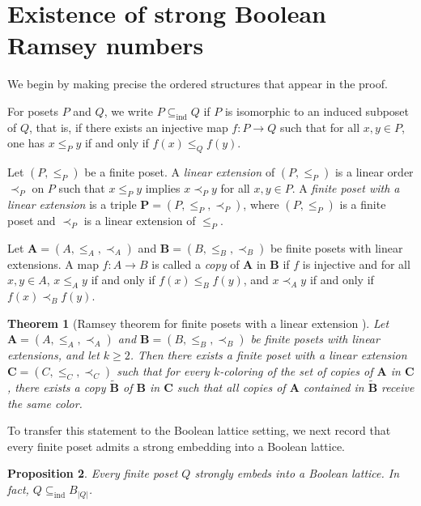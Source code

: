 \documentclass[twoside,12pt]{article}
\newtheorem{theorem}{Theorem}[section]
\newtheorem{proposition}[theorem]{Proposition}
\newcommand{\ind}{\mathrm{ind}}
\begin{document}
\section{Existence of strong Boolean Ramsey numbers}\label{sec6}











We begin by making precise the ordered structures that appear in the proof.

For posets $P$ and $Q$, we write $P\subseteq_{\ind} Q$ if $P$ is isomorphic to an
induced subposet of $Q$, that is, if there exists an injective map
$f:P\to Q$ such that for all $x,y\in P$, one has
$x\le_P y$ if and only if $f(x)\le_Q f(y)$.

Let $(P,\le_P)$ be a finite poset. A \emph{linear extension} of $(P,\le_P)$ is a
linear order $\prec_P$ on $P$ such that $x\le_P y$ implies $x\prec_P y$ for all
$x,y\in P$. A \emph{finite poset with a linear extension} is a triple
$\mathbf P=(P,\le_P,\prec_P)$, where $(P,\le_P)$ is a finite poset and
$\prec_P$ is a linear extension of $\le_P$.

Let $\mathbf A=(A,\le_A,\prec_A)$ and $\mathbf B=(B,\le_B,\prec_B)$ be finite
posets with linear extensions. A map $f:A\to B$ is called a \emph{copy} of
$\mathbf A$ in $\mathbf B$ if $f$ is injective and for all $x,y\in A$,
$x\le_A y$ if and only if $f(x)\le_B f(y)$, and
$x\prec_A y$ if and only if $f(x)\prec_B f(y)$.

\begin{theorem}[Ramsey theorem for finite posets with a linear extension {\upshape\cite[Theorem~6]{ArmanRodl17}}]\label{th:ordered-poset-ramsey}
Let $\mathbf A=(A,\le_A,\prec_A)$ and $\mathbf B=(B,\le_B,\prec_B)$ be finite
posets with linear extensions, and let $k\ge 2$. Then there exists a finite
poset with a linear extension $\mathbf C=(C,\le_C,\prec_C)$ such that for every
$k$-coloring of the set of copies of $\mathbf A$ in $\mathbf C$, there exists a
copy $\widetilde{\mathbf B}$ of $\mathbf B$ in $\mathbf C$ such that all copies
of $\mathbf A$ contained in $\widetilde{\mathbf B}$ receive the same color.
\end{theorem}
To transfer this statement to the Boolean lattice setting, we next record that every finite poset
admits a strong embedding into a Boolean lattice.
\begin{proposition}\label{prop:strong-embed-boolean}
Every finite poset $Q$ strongly embeds into a Boolean lattice. In fact,
$Q\subseteq_{\ind} B_{|Q|}$.
\end{proposition}
\end{document}
